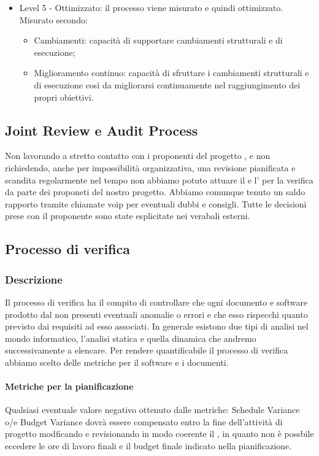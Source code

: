 \begin{itemize}
\begin{itemize}
				\end{itemize}
			\item Level 5 - Ottimizzato: il processo viene misurato e quindi ottimizzato.
			Misurato secondo:
				\begin{itemize}
					\item Cambiamenti: capacità di supportare cambiamenti strutturali e di esecuzione;
					\item Miglioramento continuo: capacità di sfruttare i cambiamenti strutturali e di esecuzione così da migliorarsi continuamente nel raggiungimento dei propri obiettivi.
				\end{itemize}
			\end{itemize}
			

\subsection{Joint Review e Audit Process}
Non lavorando a stretto contatto con i proponenti del progetto , e non richiedendo, anche per impossibilità organizzativa, una revisione pianificata e scandita regolarmente nel tempo non abbiamo potuto attuare il   e l' per la verifica da parte dei proponeti del nostro progetto. Abbiamo comunque tenuto un saldo rapporto  tramite chiamate voip per eventuali dubbi e consigli. Tutte le decisioni prese con il proponente sono state esplicitate nei verabali esterni.


\subsection{Processo di verifica}
\subsubsection{Descrizione}
Il processo di verifica ha il compito di controllare che ogni documento e software prodotto dal  non presenti eventuali anomalie o errori e che esso rispecchi quanto previsto dai requisiti ad esso associati. In generale esistono due tipi di analisi nel mondo informatico, l'analisi statica e quella dinamica che andremo successivamente a elencare. Per rendere quantificabile il processo di verifica abbiamo scelto delle metriche per il software e i documenti.

\paragraph{Metriche per la pianificazione}
Qualsiasi eventuale valore negativo ottenuto dalle  metriche: Schedule Variance o/e Budget Variance dovrà essere  compensato entro la fine dell'attività di progetto modficando e revisionando in modo coerente il \PdP, in quanto non è possbile eccedere le ore di lavoro finali e il budget finale indicato nella pianificazione.
						
